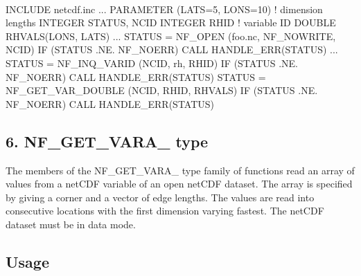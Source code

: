  

I\+N\+C\+L\+U\+DE \textquotesingle{}netcdf.\+inc\textquotesingle{} ... P\+A\+R\+A\+M\+E\+T\+ER (L\+A\+TS=5, L\+O\+NS=10) ! dimension lengths I\+N\+T\+E\+G\+ER S\+T\+A\+T\+US, N\+C\+ID I\+N\+T\+E\+G\+ER R\+H\+ID ! variable ID D\+O\+U\+B\+LE R\+H\+V\+A\+L\+S(\+L\+O\+N\+S, L\+A\+T\+S) ... S\+T\+A\+T\+US = N\+F\+\_\+\+O\+P\+EN (\textquotesingle{}foo.\+nc\textquotesingle{}, N\+F\+\_\+\+N\+O\+W\+R\+I\+TE, N\+C\+ID) IF (S\+T\+A\+T\+US .NE. N\+F\+\_\+\+N\+O\+E\+RR) C\+A\+LL H\+A\+N\+D\+L\+E\+\_\+\+E\+R\+R(\+S\+T\+A\+T\+U\+S) ... S\+T\+A\+T\+US = N\+F\+\_\+\+I\+N\+Q\+\_\+\+V\+A\+R\+ID (N\+C\+ID, \textquotesingle{}rh\textquotesingle{}, R\+H\+ID) IF (S\+T\+A\+T\+US .NE. N\+F\+\_\+\+N\+O\+E\+RR) C\+A\+LL H\+A\+N\+D\+L\+E\+\_\+\+E\+R\+R(\+S\+T\+A\+T\+U\+S) S\+T\+A\+T\+US = N\+F\+\_\+\+G\+E\+T\+\_\+\+V\+A\+R\+\_\+\+D\+O\+U\+B\+LE (N\+C\+ID, R\+H\+ID, R\+H\+V\+A\+LS) IF (S\+T\+A\+T\+US .NE. N\+F\+\_\+\+N\+O\+E\+RR) C\+A\+LL H\+A\+N\+D\+L\+E\+\_\+\+E\+R\+R(\+S\+T\+A\+T\+U\+S)

\subsection*{6. N\+F\+\_\+\+G\+E\+T\+\_\+\+V\+A\+R\+A\+\_\+ type }

The members of the N\+F\+\_\+\+G\+E\+T\+\_\+\+V\+A\+R\+A\+\_\+ type family of functions read an array of values from a net\+C\+DF variable of an open net\+C\+DF dataset. The array is specified by giving a corner and a vector of edge lengths. The values are read into consecutive locations with the first dimension varying fastest. The net\+C\+DF dataset must be in data mode.

\subsection*{Usage }

 

